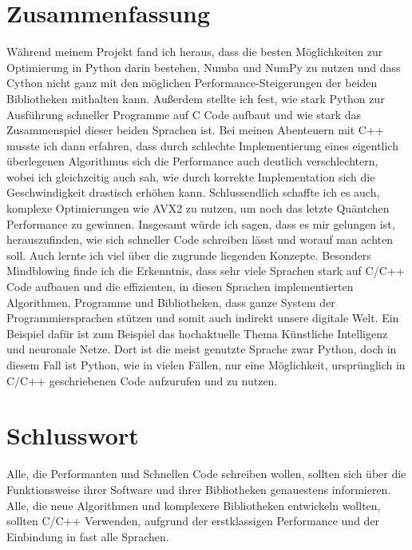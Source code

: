 \documentclass[10pt,a4paper]{article}
\begin{document}
\clearpage

\section{Zusammenfassung}

Während meinem Projekt fand ich heraus, dass die besten Möglichkeiten zur Optimierung in Python darin bestehen,
Numba und NumPy zu nutzen und dass Cython nicht ganz mit den möglichen Performance-Steigerungen der beiden Bibliotheken mithalten kann.
Außerdem stellte ich fest, wie stark Python zur Ausführung schneller Programme auf C Code aufbaut und wie stark das Zusammenspiel dieser
beiden Sprachen ist.
Bei meinen Abenteuern mit C++ musste ich dann erfahren, dass durch schlechte Implementierung eines eigentlich überlegenen Algorithmus sich die
Performance auch deutlich verschlechtern, wobei ich gleichzeitig auch sah, wie durch korrekte Implementation sich die Geschwindigkeit drastisch
erhöhen kann. Schlussendlich schaffte ich es auch, komplexe Optimierungen wie AVX2 zu nutzen, um noch das letzte Quäntchen Performance zu gewinnen.
Insgesamt würde ich sagen, dass es mir gelungen ist, herauszufinden, wie sich schneller Code schreiben lässt und worauf man achten soll.
Auch lernte ich viel über die zugrunde liegenden Konzepte.
Besonders Mindblowing finde ich die Erkenntnis, dass sehr viele Sprachen stark auf C/C++ Code aufbauen
und die effizienten, in diesen Sprachen implementierten Algorithmen, Programme und Bibliotheken, dass ganze System
der Programmiersprachen stützen und somit auch indirekt unsere digitale Welt.
Ein Beispiel dafür ist zum Beispiel das hochaktuelle Thema Künstliche Intelligenz und neuronale Netze.
Dort ist die meist genutzte Sprache zwar Python, doch in diesem Fall ist Python, wie in vielen Fällen, nur
eine Möglichkeit, ursprünglich in C/C++ geschriebenen Code aufzurufen und zu nutzen.

\section{Schlusswort}

Alle, die Performanten und Schnellen Code schreiben wollen, sollten sich über die Funktionsweise ihrer
Software und ihrer Bibliotheken genauestens informieren.
Alle, die neue Algorithmen und komplexere Bibliotheken entwickeln wollten, sollten C/C++
Verwenden, aufgrund der erstklassigen Performance und der Einbindung in fast alle Sprachen.

\clearpage

\printbibliography[title={Literaturverzeichnis}]
\end{document}
